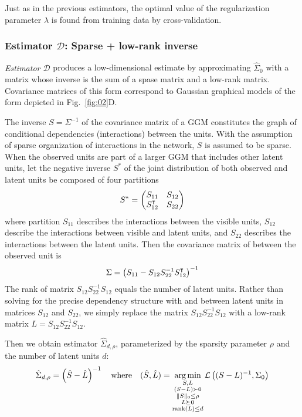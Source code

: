 Just as in the previous estimators, the optimal value of the regularization parameter $\lambda$ is found from training data by cross-validation. 

\subsubsection*{Estimator $\mathcal D$: Sparse + low-rank inverse}
\emph{Estimator $\mathcal D$} produces a low-dimensional estimate by approximating $\hat\Sigma_0$ with a matrix whose inverse is the sum of a spase matrix and a low-rank matrix. Covariance matrices of this form correspond to Gaussian graphical models of the form depicted in Fig.~\ref{fig:02}D.

The inverse $S=\Sigma^{-1}$ of the covariance matrix of a GGM constitutes the graph of conditional dependencies (interactions) between the units.  With the assumption of sparse organization of interactions in the network, $S$ is assumed to be sparse.  When the observed units are part of a larger GGM that includes other latent units, let the negative inverse $S^*$ of the joint distribution of both observed and latent units be composed of four partitions
\begin{equation}
S^* = 
\begin{pmatrix}
S_{11} & S_{12} \\
S_{12}^\intercal & S_{22} 
\end{pmatrix}
\end{equation}
where partition $S_{11}$ describes the interactions between the visible units, $S_{12}$ describe the interactions between visible and latent units, and $S_{22}$ describes the interactions between the latent units. 
Then the covariance matrix of between the observed unit is 
\begin{equation}
\Sigma = \left(S_{11} - S_{12}S_{22}^{-1}S_{12}^\intercal\right)^{-1}
\end{equation} 
The rank of matrix $S_{12}S_{22}^{-1}S_{12}$ equals the number of latent units. Rather than solving for the precise dependency structure with and between latent units in matrices $S_{12}$ and $S_{22}$, we simply replace the matrix $ S_{12}S_{22}^{-1}S_{12}$ with a low-rank matrix $L= S_{12}S_{22}^{-1}S_{12}$.

Then we obtain estimator $\hat\Sigma_{d,\rho}$, parameterized by the sparsity parameter $\rho$ and  the number of latent units $d$:
\begin{equation}
\hat\Sigma_{d,\rho} = \left(\hat S-\hat L\right)^{-1}
\quad\mbox{where}\quad
(\hat S, \hat L) = \operatorname*{arg\,min}\limits_{\substack{S,L\\ (S-L)\succ 0 \\ \|S\|_0\le\rho \\ L\succeq 0 \\ \operatorname{rank}(L) \le d}} \mathcal L\left((S-L)^{-1},\Sigma_0\right)
\end{equation}

